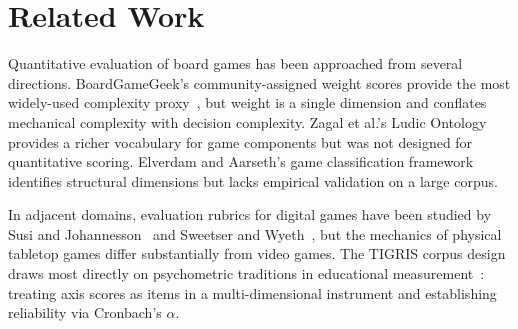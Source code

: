 \section{Related Work}
\label{sec:related}

Quantitative evaluation of board games has been approached from several directions.
BoardGameGeek's community-assigned weight scores provide the most widely-used
complexity proxy~\cite{woods2012eurogames}, but weight is a single dimension and
conflates mechanical complexity with decision complexity. Zagal et al.'s Ludic
Ontology~\cite{zagal2008collaborative} provides a richer vocabulary for game
components but was not designed for quantitative scoring. Elverdam and Aarseth's
game classification framework~\cite{elverdam2007game} identifies structural
dimensions but lacks empirical validation on a large corpus.

In adjacent domains, evaluation rubrics for digital games have been studied by
Susi and Johannesson~\cite{susi2000play} and Sweetser and Wyeth~\cite{sweetser2005gameflow},
but the mechanics of physical tabletop games differ substantially from video games.
The TIGRIS corpus design draws most directly on psychometric traditions in educational
measurement~\cite{cronbach1951coefficient}: treating axis scores as items in a
multi-dimensional instrument and establishing reliability via Cronbach's $\alpha$.
